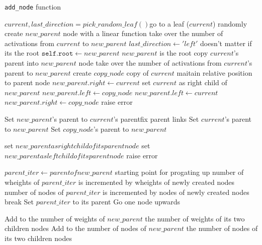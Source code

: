 \begin{algorithm}[!ht]
\caption{\texttt{add\_node} function}
\label{algo:pseudo_add_node_function}
\begin{algorithmic}
\State $current, last\_direction = pick\_random\_leaf()$\Comment go to a leaf ($current$) randomly
    \State create $new\_parent$ node with a linear function
    \State take over the number of activations from $current$ to $new\_parent$
    \State $last\_direction \gets 'left'$ \Comment doesn't matter if its the root
    \State $\texttt{self.root} \gets new\_parent$ \Comment $new\_parent$ is the root
\Else
    \State copy $current$'s parent into $new\_parent$ node
    \State take over the number of activations from $current$'s parent to $new\_parent$
\EndIf
\State create $copy\_node$ \Comment copy of $current$
\Comment maitain relative position to parent node
    \State $new\_parent.right \gets current$ \Comment set $current$ as right child of $new\_parent$
    \State $new\_parent.left \gets copy\_node$
    \State $new\_parent.left \gets current$
    \State $new\_parent.right \gets copy\_node$
\Else
    \State raise error
\EndIf

\State Set $new\_parent$'s parent to $current$'s parent\Comment fix parent links
\State Set $current$'s parent to $new\_parent$
\State Set $copy\_node$'s parent to $new\_parent$

        \State set $new\_parent as right child of its parent node$
        \State set $new\_parent as left child of its parent node$
    \Else
        \State raise error
    \EndIf
\EndIf

    \State $parent\_iter \gets parent of new\_parent$ \Comment starting point for progating up
        \State number of wheights of $parent\_iter$ is incremented by wheights of newly created nodes
        \State number of nodes of $parent\_iter$ is incremented by nodes of newly created nodes
            \State break
        \Else
            \State Set $parent\_iter$ to its parent \Comment Go one node upwards
        \EndIf

    \EndWhile
\EndIf

\State Add to the number of weights of $new\_parent$ the number of weights of its two children nodes
\State Add to the number of nodes of $new\_parent$ the number of nodes of its two children nodes

\EndFunction
\end{algorithmic}
\end{algorithm}

